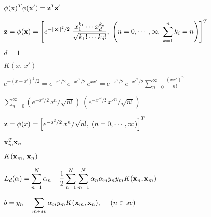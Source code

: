 \documentclass{article}
\def\lthtmlcheckvsize{\ifdim\ht\sizebox<\vsize 
  \ifdim\wd\sizebox<\hsize\expandafter\hfill\fi \expandafter\vfill
  \else\expandafter\vss\fi}%
\begin{document}
{\newpage\clearpage
{}%
$\displaystyle \phi({\bf x})^T \phi({\bf x}')={\bf z}^T{\bf z}'$%
\lthtmlindisplaymathZ
\lthtmlcheckvsize\clearpage}

{\newpage\clearpage
{}%
$\displaystyle {\bf z}=\phi({\bf x})=\left[ e^{-||{\bf x}||^2/2}\;\frac{x_1^{k_1}\cdots x_d^{k_d}}{\sqrt{ k_1!\cdots k_d!}},
\;\left(n=0,\cdots,\infty,\;\sum_{k=1}^nk_i=n\right) \right]^T$%
\lthtmlindisplaymathZ
\lthtmlcheckvsize\clearpage}

{\newpage\clearpage
{}%
$ d=1$%
\lthtmlindisplaymathZ
\lthtmlcheckvsize\clearpage}

{\newpage\clearpage
{}%
$\displaystyle K(x,\,x')$%
\lthtmlindisplaymathZ
\lthtmlcheckvsize\clearpage}

{\newpage\clearpage
{}%
$\displaystyle e^{-(x-x')^2/2}=e^{-x^2/2}\, e^{-x'^2/2}\, e^{xx'}
=e^{-x^2/2}\, e^{-x'^2/2} \sum_{n=0}^\infty \frac{(xx')^n}{n!}$%
\lthtmlindisplaymathZ
\lthtmlcheckvsize\clearpage}

{\newpage\clearpage
{}%
$\displaystyle \sum_{n=0}^\infty (e^{-x^2/2}\,x^n/\sqrt{n!})\;(e^{-x'^2/2}\,x'^n/\sqrt{n!})$%
\lthtmlindisplaymathZ
\lthtmlcheckvsize\clearpage}

{\newpage\clearpage
{}%
$ {\bf z}=\phi(x)=\left[ e^{-x^2/2}\,x^n/\sqrt{n!},\;(n=0,\cdots,\infty)\right]^T$%
\lthtmlindisplaymathZ
\lthtmlcheckvsize\clearpage}

{\newpage\clearpage
{}%
$ {\bf x}_m^T{\bf x}_n$%
\lthtmlindisplaymathZ
\lthtmlcheckvsize\clearpage}

{\newpage\clearpage
{}%
$ K({\bf x}_m,\,{\bf x}_n)$%
\lthtmlindisplaymathZ
\lthtmlcheckvsize\clearpage}

{\newpage\clearpage
{}%
$\displaystyle L_d({\bf\alpha})
=\sum_{n=1}^N\alpha_n -\frac{1}{2}
\sum_{n=1}^N \sum_{m=1}^N \alpha_n \alpha_m y_n y_m K({\bf x}_n,{\bf x}_m)$%
\lthtmlindisplaymathZ
\lthtmlcheckvsize\clearpage}

{\newpage\clearpage
{}%
$\displaystyle b=y_n-\sum_{m \in sv} \alpha_m y_m K({\bf x}_m,{\bf x}_n),\;\;\;\;\;(n\in sv)$%
\lthtmlindisplaymathZ
\lthtmlcheckvsize\clearpage}
\end{document}
